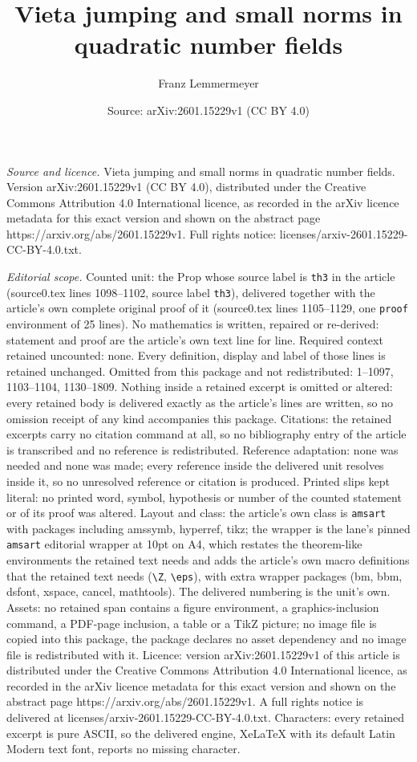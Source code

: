 \documentclass[10pt,a4paper]{amsart}
\title[Vieta jumping and small norms in quadratic number fields]{Vieta jumping and small norms in quadratic number fields}
\author{Franz Lemmermeyer}
\date{Source: arXiv:2601.15229v1 (CC BY 4.0)}
\begin{document}
\maketitle

\noindent\emph{Source and licence.} Vieta jumping and small norms in quadratic number fields. Version arXiv:2601.15229v1 (CC BY 4.0), distributed under the Creative Commons Attribution 4.0 International licence, as recorded in the arXiv licence metadata for this exact version and shown on the abstract page https://arxiv.org/abs/2601.15229v1. Full rights notice: licenses/arxiv-2601.15229-CC-BY-4.0.txt.\par\smallskip

\noindent\textit{Editorial scope.} Counted unit: the Prop whose source label is \texttt{th3} in the article (source0.tex lines 1098--1102, source label \texttt{th3}), delivered together with the article's own complete original proof of it (source0.tex lines 1105--1129, one \texttt{proof} environment of 25 lines). No mathematics is written, repaired or re-derived: statement and proof are the article's own text line for line. Required context retained uncounted: none. Every definition, display and label of those lines is retained unchanged. Omitted from this package and not redistributed: 1--1097, 1103--1104, 1130--1809. Nothing inside a retained excerpt is omitted or altered: every retained body is delivered exactly as the article's lines are written, so no omission receipt of any kind accompanies this package. Citations: the retained excerpts carry no citation command at all, so no bibliography entry of the article is transcribed and no reference is redistributed. Reference adaptation: none was needed and none was made; every reference inside the delivered unit resolves inside it, so no unresolved reference or citation is produced. Printed slips kept literal: no printed word, symbol, hypothesis or number of the counted statement or of its proof was altered. Layout and class: the article's own class is \texttt{amsart} with packages including amssymb, hyperref, tikz; the wrapper is the lane's pinned \texttt{amsart} editorial wrapper at 10pt on A4, which restates the theorem-like environments the retained text needs and adds the article's own macro definitions that the retained text needs (\texttt{\textbackslash Z}, \texttt{\textbackslash eps}), with extra wrapper packages (bm, bbm, dsfont, xspace, cancel, mathtools). The delivered numbering is the unit's own. Assets: no retained span contains a figure environment, a graphics-inclusion command, a PDF-page inclusion, a table or a TikZ picture; no image file is copied into this package, the package declares no asset dependency and no image file is redistributed with it. Licence: version arXiv:2601.15229v1 of this article is distributed under the Creative Commons Attribution 4.0 International licence, as recorded in the arXiv licence metadata for this exact version and shown on the abstract page https://arxiv.org/abs/2601.15229v1. A full rights notice is delivered at licenses/arxiv-2601.15229-CC-BY-4.0.txt. Characters: every retained excerpt is pure ASCII, so the delivered engine, XeLaTeX with its default Latin Modern text font, reports no missing character.
\end{document}
